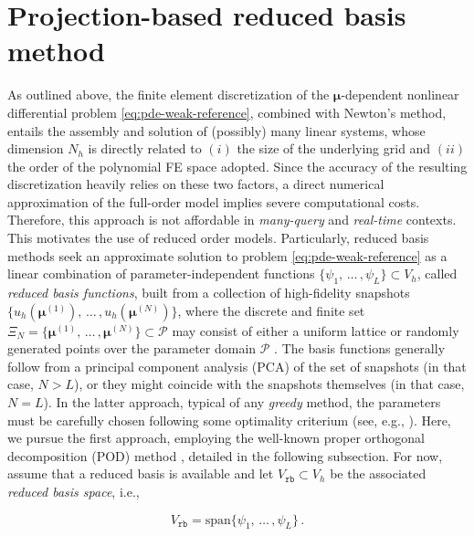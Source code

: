 \documentclass[longtitle]{elsarticle}
\numberwithin{equation}{section}
\theoremstyle{theorem}
\theoremstyle{definition}
\theoremstyle{remark}
\theoremstyle{proposition}
\numberwithin{figure}{section}
\newcommand{\bg}[1]{\boldsymbol{#1}}
\begin{document}
	
	\section{Projection-based reduced basis method}
	\label{section:Projection-based reduced basis method}
	
		As outlined above, the finite element discretization of the $\bg{\mu}$-dependent nonlinear differential problem \eqref{eq:pde-weak-reference}, combined with Newton's method, entails the assembly and solution of (possibly) many linear systems, whose dimension $N_h$ is directly related to $(i)$ the size of the underlying grid and $(ii)$ the order of the polynomial FE space adopted. Since the accuracy of the resulting discretization heavily relies on these two factors, a direct numerical approximation of the full-order model implies severe computational costs. Therefore, this approach is not affordable in \emph{many-query} and \emph{real-time} contexts. This motivates the use of reduced order models. Particularly, reduced basis methods seek an approximate solution to problem \eqref{eq:pde-weak-reference} as a linear combination of parameter-independent functions $\big\lbrace \psi_1, \, \ldots \, , \psi_L \big\rbrace \subset V_h$, called \emph{reduced basis functions}, built from a collection of high-fidelity snapshots $\big\lbrace u_h \left( \bg{\mu}^{(1)} \right), \, \ldots \, , u_h \left( \bg{\mu}^{(N)} \right) \big\rbrace$, where the discrete and finite set $\Xi_N = \big\lbrace \bg{\mu}^{(1)}, \, \ldots \, , \bg{\mu}^{(N)} \big\rbrace \subset \mathcal{P}$ may consist of either a uniform lattice or randomly generated points over the parameter domain $\mathcal{P}$ \cite{HSR16}. The basis functions  generally follow from a principal component analysis (PCA) of the set of snapshots (in that case, $N > L$), or they might coincide with the snapshots themselves (in that case, $N = L$). In the latter approach, typical of any \emph{greedy} method, the parameters \smash{$\big\lbrace \bg{\mu}^{(n)} \big\rbrace_{1 \leq n \leq N}$} must be carefully chosen following some optimality criterium (see, e.g., \cite{Chen17}). Here, we pursue the first approach, employing the well-known proper orthogonal decomposition (POD) method \cite{Lia02, Vol08}, detailed in the following subsection. For now, assume that a reduced basis is available and let $V_{\texttt{rb}} \subset V_h$ be the associated \emph{reduced basis space}, i.e.,
		\begin{linenomath}\begin{equation*}
			V_{\texttt{rb}} = \text{span} \big\lbrace \psi_1, \, \ldots \, , \psi_L \big\rbrace \, .
		\end{equation*}\end{linenomath} 
\end{document}

